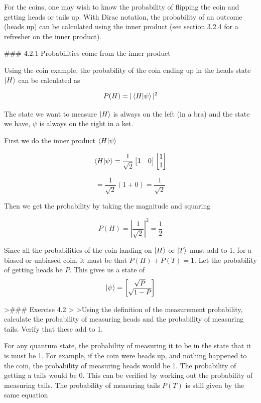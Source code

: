 \documentclass{book}
\begin{document}
For the coins, one may wish to know the probability of flipping the coin and getting heads or tails up. With Dirac notation, the probability of an outcome (heads up) can be calculated using the inner product (see section 3.2.4 for a refresher on the inner product).

### 4.2.1 Probabilities come from the inner product

Using the coin example, the probability of the coin ending up in the heads state $\ket{H}$ can be calculated as

$$ P(H) = |\braket{H|\psi}|^2  $$

The state we want to measure $\ket{H}$ is always on the left (in a bra) and the state we have, $\psi$ is always on the right in a ket.

First we do the inner product $\braket{H|\psi}$

$$
\braket{H|\psi} = \frac{1}{\sqrt{2}}\begin{bmatrix} 1 & 0 \end{bmatrix} \begin{bmatrix} 1 \\ 1 \end{bmatrix}
$$

$$ = \frac{1}{\sqrt{2}} (1 + 0 ) = \frac{1}{\sqrt{2}}$$

Then we get the probability by taking the magnitude and squaring 

$$ P(H) = \left| \frac{1}{\sqrt{2}} \right|^2 = \frac{1}{2} $$

Since all the probabilities of the coin landing on $\ket{H}$ or $\ket{T}$ must add to 1, for a biased or unbiased coin, it must be that $P(H) + P(T) = 1$. Let the probability of getting heads be $P$. This gives us a state of 
$$
\ket{\psi} = \begin{bmatrix} \sqrt{P} \\ \sqrt{1-P} \end{bmatrix}
$$



>### Exercise 4.2
>
>Using the definition of the measurement probability, calculate the probability of measuring heads and the probability of measuring tails. Verify that these add to 1. 



For any quantum state, the probability of measuring it to be in the state that it is must be 1. For example, if the coin were heads up, and nothing happened to the coin, the probability of measuring heads would be 1. The probability of getting a tails would be 0. This can be verified by working out the probability of measuring tails. The probability of measuring tails $P(T)$ is still given by the same equation 
\end{document}
